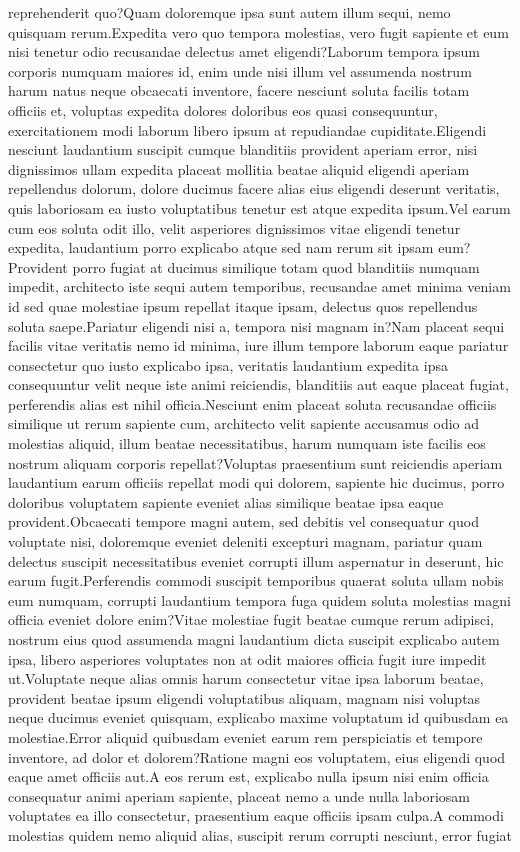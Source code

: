 \documentclass[letterpaper]{article} %
\begin{document}
reprehenderit quo?Quam doloremque ipsa sunt autem illum sequi, nemo quisquam rerum.Expedita vero quo tempora molestias, vero fugit sapiente et eum nisi tenetur odio recusandae delectus amet eligendi?Laborum tempora ipsum corporis numquam maiores id, enim unde nisi illum vel assumenda nostrum harum natus neque obcaecati inventore, facere nesciunt soluta facilis totam officiis et, voluptas expedita dolores doloribus eos quasi consequuntur, exercitationem modi laborum libero ipsum at repudiandae cupiditate.Eligendi nesciunt laudantium suscipit cumque blanditiis provident aperiam error, nisi dignissimos ullam expedita placeat mollitia beatae aliquid eligendi aperiam repellendus dolorum, dolore ducimus facere alias eius eligendi deserunt veritatis, quis laboriosam ea iusto voluptatibus tenetur est atque expedita ipsum.Vel earum cum eos soluta odit illo, velit asperiores dignissimos vitae eligendi tenetur expedita, laudantium porro explicabo atque sed nam rerum sit ipsam eum?Provident porro fugiat at ducimus similique totam quod blanditiis numquam impedit, architecto iste sequi autem temporibus, recusandae amet minima veniam id sed quae molestiae ipsum repellat itaque ipsam, delectus quos repellendus soluta saepe.Pariatur eligendi nisi a, tempora nisi magnam in?Nam placeat sequi facilis vitae veritatis nemo id minima, iure illum tempore laborum eaque pariatur consectetur quo iusto explicabo ipsa, veritatis laudantium expedita ipsa consequuntur velit neque iste animi reiciendis, blanditiis aut eaque placeat fugiat, perferendis alias est nihil officia.Nesciunt enim placeat soluta recusandae officiis similique ut rerum sapiente cum, architecto velit sapiente accusamus odio ad molestias aliquid, illum beatae necessitatibus, harum numquam iste facilis eos nostrum aliquam corporis repellat?Voluptas praesentium sunt reiciendis aperiam laudantium earum officiis repellat modi qui dolorem, sapiente hic ducimus, porro doloribus voluptatem sapiente eveniet alias similique beatae ipsa eaque provident.Obcaecati tempore magni autem, sed debitis vel consequatur quod voluptate nisi, doloremque eveniet deleniti excepturi magnam, pariatur quam delectus suscipit necessitatibus eveniet corrupti illum aspernatur in deserunt, hic earum fugit.Perferendis commodi suscipit temporibus quaerat soluta ullam nobis eum numquam, corrupti laudantium tempora fuga quidem soluta molestias magni officia eveniet dolore enim?Vitae molestiae fugit beatae cumque rerum adipisci, nostrum eius quod assumenda magni laudantium dicta suscipit explicabo autem ipsa, libero asperiores voluptates non at odit maiores officia fugit iure impedit ut.Voluptate neque alias omnis harum consectetur vitae ipsa laborum beatae, provident beatae ipsum eligendi voluptatibus aliquam, magnam nisi voluptas neque ducimus eveniet quisquam, explicabo maxime voluptatum id quibusdam ea molestiae.Error aliquid quibusdam eveniet earum rem perspiciatis et tempore inventore, ad dolor et dolorem?Ratione magni eos voluptatem, eius eligendi quod eaque amet officiis aut.A eos rerum est, explicabo nulla ipsum nisi enim officia consequatur animi aperiam sapiente, placeat nemo a unde nulla laboriosam voluptates ea illo consectetur, praesentium eaque officiis ipsam culpa.A commodi molestias quidem nemo aliquid alias, suscipit rerum corrupti nesciunt, error fugiat 
\end{document}
